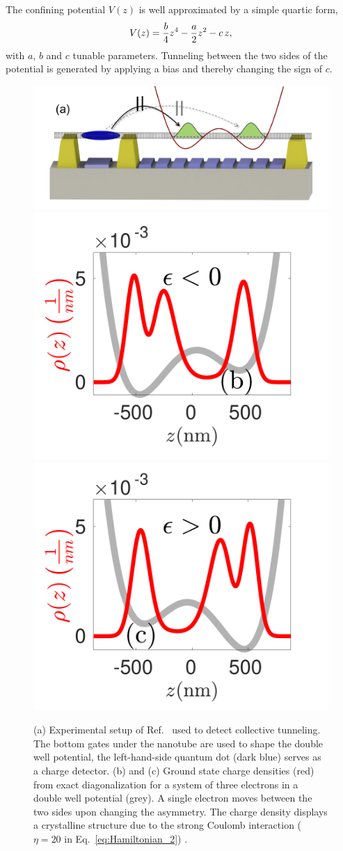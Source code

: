 \documentclass[aps, prb, floatfix, twocolumn, notitlepage, superscriptaddress, 10pt]{revtex4-2}
\newcommand{\1}{{1\hspace*{-0.5ex} \textrm{l} \hspace*{0.5ex}}}
\begin{document}
The confining  potential  $V(z)$ is well approximated by a simple quartic form,
\begin{gather}
	V(z) = {b\over 4} z^4 -{a\over 2} z^2 - c \,z,
	\label{eq:potential}
\end{gather} 
with $a$, $b$ and $c$ tunable parameters. Tunneling between the two sides of the potential 
is generated by applying a bias and thereby changing the sign of $c$. 

\begin{figure}[b!]
    \begin{center}
    \includegraphics[width=0.9\columnwidth]{sketch_experiment_v2.pdf} %
	 \includegraphics[width=0.49\columnwidth]{Fig_WaveFunction_Potential_NegEps_normalized.pdf}
     \includegraphics[width=0.49\columnwidth]{Fig_WaveFunction_Potential_PosEps_normalized.pdf}
	
    \end{center}
    \caption{(a)   Experimental setup of Ref.~\cite{Shapir.2019} used to detect 
	 collective tunneling. The bottom gates under the nanotube  are used to shape the double well potential, 
	 the left-hand-side quantum dot (dark blue)  serves as a charge detector.
	 (b) and (c) Ground state charge densities (red) from exact diagonalization for a system of three electrons  in a double well potential (grey).  A single electron moves between the two sides upon changing the asymmetry. The charge density displays a crystalline structure 
	 due to the strong Coulomb interaction ($\eta=20$ in Eq.~\eqref{eq:Hamiltonian_2}) .}
     \label{fig:experimental_setup}
\end{figure}
\end{document}
